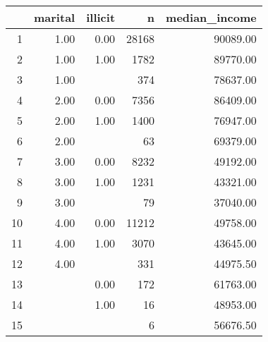 \begin{table}[ht]
\centering
\begin{tabular}{rrrrr}
  \hline
 & marital & illicit & n & median\_income \\ 
  \hline
1 & 1.00 & 0.00 & 28168 & 90089.00 \\ 
  2 & 1.00 & 1.00 & 1782 & 89770.00 \\ 
  3 & 1.00 &  & 374 & 78637.00 \\ 
  4 & 2.00 & 0.00 & 7356 & 86409.00 \\ 
  5 & 2.00 & 1.00 & 1400 & 76947.00 \\ 
  6 & 2.00 &  &  63 & 69379.00 \\ 
  7 & 3.00 & 0.00 & 8232 & 49192.00 \\ 
  8 & 3.00 & 1.00 & 1231 & 43321.00 \\ 
  9 & 3.00 &  &  79 & 37040.00 \\ 
  10 & 4.00 & 0.00 & 11212 & 49758.00 \\ 
  11 & 4.00 & 1.00 & 3070 & 43645.00 \\ 
  12 & 4.00 &  & 331 & 44975.50 \\ 
  13 &  & 0.00 & 172 & 61763.00 \\ 
  14 &  & 1.00 &  16 & 48953.00 \\ 
  15 &  &  &   6 & 56676.50 \\ 
   \hline
\end{tabular}
\end{table}
